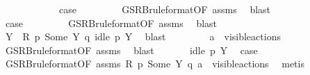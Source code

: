 \begin{isabellebody}
\ \ \ \ \isamarkupfalse%
\ {}\isanewline
\ \ \ \ \isamarkupfalse%
\ {\isacharquery}{\kern0pt}case\ \isanewline
\ \ \ \ \ \ \isamarkupfalse%
\ GSRB{\isacharunderscore}{\kern0pt}ruleformat{\isacharparenleft}{\kern0pt}{}{\isacharcomma}{\kern0pt}{}{\isacharparenright}{\kern0pt}{\isacharbrackleft}{\kern0pt}OF\ assms{\isacharbrackright}{\kern0pt}\ \isamarkupfalse%
\ blast\isanewline
\ \ \isamarkupfalse%
\isanewline
\ \ \ \ \isamarkupfalse%
\ {}\isanewline
\ \ \ \ \isamarkupfalse%
\ {\isacharquery}{\kern0pt}case\ \isanewline
\ \ \ \ \ \ \isamarkupfalse%
\ GSRB{\isacharunderscore}{\kern0pt}ruleformat{\isacharparenleft}{\kern0pt}{}{\isacharparenright}{\kern0pt}{\isacharbrackleft}{\kern0pt}OF\ assms{\isacharbrackright}{\kern0pt}\ \isamarkupfalse%
\ blast\isanewline
\ \ \isamarkupfalse%
\isanewline
\ \ \ \ \isamarkupfalse%
\ {}\isanewline
\ \ \ \ \isamarkupfalse%
\ \isamarkupfalse%
\ Y\ \ {\isacartoucheopen}R\ p\ {\isacharparenleft}{\kern0pt}Some\ Y{\isacharparenright}{\kern0pt}\ q{\isacartoucheclose}\ {\isacartoucheopen}idle\ p\ Y{\isacartoucheclose}\ \isamarkupfalse%
\ blast\isanewline
\ \ \ \ \isamarkupfalse%
\ {}\ \isamarkupfalse%
\ {\isacartoucheopen}a\ {\isasymin}\ visible{\isacharunderscore}{\kern0pt}actions{\isacartoucheclose}\isanewline
\ \ \ \ \ \ \isamarkupfalse%
\ GSRB{\isacharunderscore}{\kern0pt}ruleformat{\isacharparenleft}{\kern0pt}{}{\isacharparenright}{\kern0pt}{\isacharbrackleft}{\kern0pt}OF\ assms{\isacharbrackright}{\kern0pt}\ \isamarkupfalse%
\ blast\isanewline
\ \ \ \ \isamarkupfalse%
\ {}\ {\isacartoucheopen}idle\ p\ Y{\isacartoucheclose}\ \isamarkupfalse%
\ {\isacharquery}{\kern0pt}case\ \isanewline
\ \ \ \ \ \ \isamarkupfalse%
\ GSRB{\isacharunderscore}{\kern0pt}ruleformat{\isacharparenleft}{\kern0pt}{}{\isacharparenright}{\kern0pt}{\isacharbrackleft}{\kern0pt}OF\ assms\ {\isacartoucheopen}R\ p\ {\isacharparenleft}{\kern0pt}Some\ Y{\isacharparenright}{\kern0pt}\ q{\isacartoucheclose}\ {\isacartoucheopen}a\ {\isasymin}\ visible{\isacharunderscore}{\kern0pt}actions{\isacartoucheclose}{\isacharbrackright}{\kern0pt}\ \isamarkupfalse%
\ metis\isanewline

\end{isabellebody}
